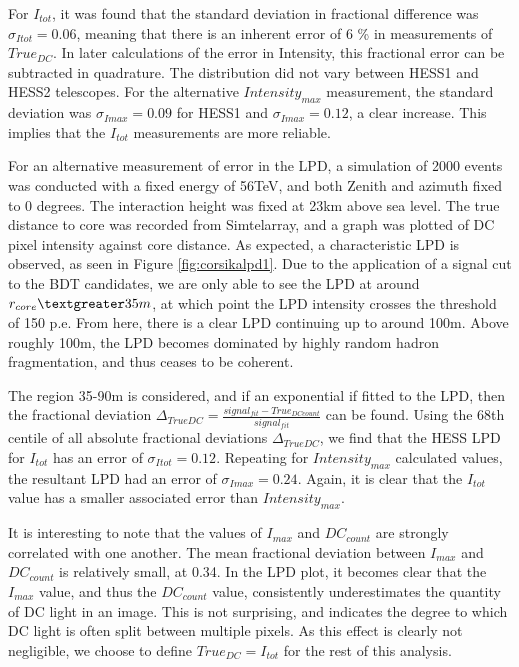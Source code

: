 \documentclass{article}
\begin{document}
For $I_{tot}$, it was found that the standard deviation in fractional difference was $\sigma_{Itot}=0.06$, meaning that there is an inherent error of 6 \% in measurements of $True_{DC}$. In later calculations of the error in Intensity, this fractional error can be subtracted in quadrature. The distribution did not vary between HESS1 and HESS2 telescopes. For the alternative $Intensity_{max}$ measurement, the standard deviation was $\sigma_{Imax}=0.09$ for HESS1 and $\sigma_{Imax}=0.12$, a clear increase. This implies that the $I_{tot}$ measurements are more reliable.

For an alternative measurement of error in the LPD, a simulation of 2000 events was conducted with a fixed energy of 56TeV, and both Zenith and azimuth fixed to 0 degrees. The interaction height was fixed at 23km above sea level. The true distance to core was recorded from Sim\textunderscore telarray, and a graph was plotted of DC pixel intensity against core distance. As expected, a characteristic LPD is observed, as seen in Figure \ref{fig:corsikalpd1}. Due to the application of a signal cut to the BDT candidates, we are only able to see the LPD at around $r_{core} \textgreater 35m$, at which point the LPD intensity crosses the threshold of 150 p.e. From here, there is a clear LPD continuing up to around 100m. Above roughly 100m, the LPD becomes dominated by highly random hadron fragmentation, and thus ceases to be coherent.

The region 35-90m is considered, and if an exponential if fitted to the LPD, then the fractional deviation $\Delta_{TrueDC} = \frac{signal_{fit} - True_{DC count}}{signal_{fit}}$ can be found. Using the 68th centile of all absolute fractional deviations $\Delta_{TrueDC}$, we find that the HESS LPD for $I_{tot}$ has an error of $\sigma_{Itot}=0.12$. Repeating for $Intensity_{max}$ calculated values, the resultant LPD had an error of $\sigma_{Imax} = 0.24$. Again, it is clear that the $I_{tot}$ value has a smaller associated error than $Intensity_{max}$.

It is interesting to note that the values of $I_{max}$ and $DC_{count}$ are strongly correlated with one another. The mean fractional deviation between $I_{max}$ and $DC_{count}$ is relatively small, at 0.34. In the LPD plot, it becomes clear that the $I_{max}$ value, and thus the $DC_{count}$ value, consistently underestimates the quantity of DC light in an image. This is not surprising, and indicates the degree to which DC light is often split between multiple pixels. As this effect is clearly not negligible, we choose to define $True_{DC}=I_{tot}$ for the rest of this analysis.
\end{document}
